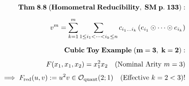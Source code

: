 \documentclass[preview]{standalone}
\begin{document}
\begin{align*}
\special{dvisvgm:raw <g id='unique000'>}\mathbf{Thm\;8.8\;(Homometral\;Reducibility,\;SM\;p.\;133):}\\[5pt]v^m = \sum_{k=1}^m \sum_{1\le i_1<\dots<i_k\le n} c_{i_1\dots i_k}\left(e_{i_1}\odot\cdots\odot e_{i_k}\right)\\[6pt]\mathbf{Cubic\;Toy\;Example\;(m=3,\; k=2):}\\[4pt]F(x_1, x_1, x_2) = x_1^2 x_2\quad(\text{Nominal Arity }m=3)\\[3pt]\implies F_{\text{red}}(u, v) := u^2 v \in \mathcal{O}_{\text{quant}}(2; 1)\quad(\text{Effective }k=2 < 3)!\special{dvisvgm:raw </g>}
\end{align*}
\end{document}
